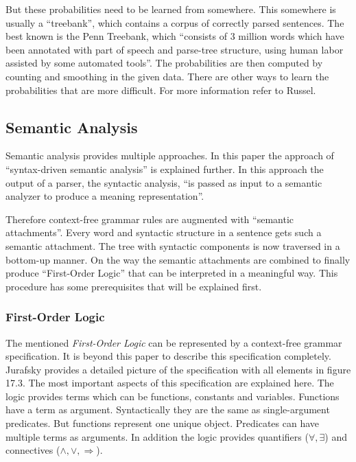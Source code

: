 \documentclass[12pt,twoside]{scrartcl}
\theoremstyle{plain}
\theoremstyle{definition}
\theoremstyle{remark}
\begin{document}
		But these probabilities need to be learned from somewhere. This somewhere is usually a ``treebank''\cite[p.~895]{Russel2010}, which contains a corpus of correctly parsed sentences. The best known is the Penn Treebank\cite{Russel2010}, which ``consists of 3 million words which have been annotated with part of speech and parse-tree structure, using human labor assisted by some automated tools''\cite[p.~895]{Russel2010}. The probabilities are then computed by counting and smoothing in the given data.\cite{Russel2010} There are other ways to learn the probabilities that are more difficult. For more information refer to Russel\cite{Russel2010}.		
		
	\subsection{Semantic Analysis}
	\label{subSec:semanticAnalysis}
	
		Semantic analysis provides multiple approaches. In this paper the approach of ``syntax-driven semantic analysis''\cite[p.~617]{Jurafsky2009} is explained further. In this approach the output of a parser, the syntactic analysis, ``is passed as input to a semantic analyzer to produce a meaning representation''\cite[p.~618]{Jurafsky2009}.

		Therefore context-free grammar rules are augmented with ``semantic attachments''\cite[p.~618]{Jurafsky2009}. Every word and syntactic structure in a sentence gets such a semantic attachment. The tree with syntactic components is now traversed in a bottom-up manner. On the way the semantic attachments are combined to finally produce ``First-Order Logic''\cite[p.~589]{Jurafsky2009a} that can be interpreted in a meaningful way. This procedure has some prerequisites that will be explained first.
		
		\subsubsection*{First-Order Logic}
		\label{subSubSec:firstOrderLogic}
		
		The mentioned \textit{First-Order Logic} can be represented by a context-free grammar specification. It is beyond this paper to describe this specification completely. Jurafsky\cite{Jurafsky2009a} provides a detailed picture of the specification with all elements in figure 17.3. The most important aspects of this specification are explained here. The logic provides terms which can be functions, constants and variables. Functions have a term as argument. Syntactically they are the same as single-argument predicates. But functions represent one unique object.
		Predicates can have multiple terms as arguments. In addition the logic provides quantifiers ($\forall, \exists$) and connectives ($\wedge, \vee, \Rightarrow$).
		
\end{document}
